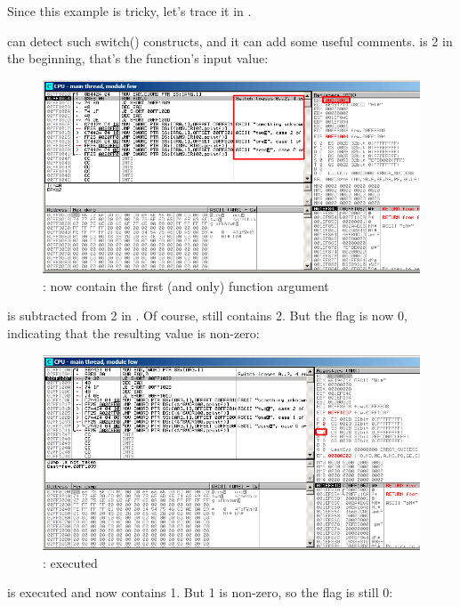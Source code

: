 ﻿\clearpage
\myparagraphold{\olly}

Since this example is tricky, let's trace it in \olly.

\olly can detect such switch() constructs, and it can add some useful comments.
\EAX is 2 in the beginning, that's the function's input value: 

\begin{figure}[H]
\centering
\includegraphics[scale=\FigScale]{patterns/08_switch/1_few/olly1.png}
\caption{\olly: \EAX 
now contain the first (and only) function argument}
\label{fig:switch_few_olly1}
\end{figure}

 is subtracted from 2 in \EAX. 
Of course, \EAX still contains 2.
But the \ZF flag is now 0, indicating that the resulting value is non-zero:

\begin{figure}[H]
\centering
\includegraphics[scale=\FigScale]{patterns/08_switch/1_few/olly2.png}
\caption{\olly: \SUB executed}
\label{fig:switch_few_olly2}
\end{figure}

\clearpage
\DEC is executed and \EAX now contains 1. 
But 1 is non-zero, so the \ZF flag is still 0:

